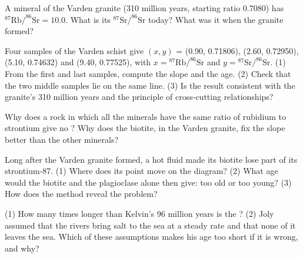 \begin{exercise}[$\star\star$]\label{exo:g12:age-of-the-earth:6}
A mineral of the Varden granite (310 million years, starting ratio 0.7080)
has $^{87}\mathrm{Rb}/^{86}\mathrm{Sr} = 10.0$. What is its
$^{87}\mathrm{Sr}/^{86}\mathrm{Sr}$ today? What was it when the granite
formed?
\end{exercise}

\begin{exercise}[$\star\star$]\label{exo:g12:age-of-the-earth:7}
Four samples of the Varden schist give $(x, y)$ = (0.90, 0.71806),
(2.60, 0.72950), (5.10, 0.74632) and (9.40, 0.77525), with $x =
{}^{87}\mathrm{Rb}/^{86}\mathrm{Sr}$ and $y = {}^{87}\mathrm{Sr}/^{86}\mathrm{Sr}$.
(1) From the first and last samples, compute the slope and the age.
(2) Check that the two middle samples lie on the same line. (3) Is the
result consistent with the granite's 310 million years and the principle of
cross-cutting relationships?
\end{exercise}

\begin{exercise}[$\star\star$]\label{exo:g12:age-of-the-earth:8}
Why does a rock in which all the minerals have the same ratio of rubidium to
strontium give no ? Why does the biotite, in the Varden granite,
fix the slope better than the other minerals?
\end{exercise}

\begin{exercise}[$\star\star$]\label{exo:g12:age-of-the-earth:9}
Long after the Varden granite formed, a hot fluid made its biotite lose part
of its strontium-87. (1) Where does its point move on the  diagram?
(2) What age would the biotite and the plagioclase alone then give: too old or
too young? (3) How does the  method reveal the problem?
\end{exercise}

\begin{exercise}[$\star\star$]\label{exo:g12:age-of-the-earth:10}
(1) How many times longer than Kelvin's 96 million years is the ? (2) Joly assumed that the rivers bring salt to the sea at a steady
rate and that none of it leaves the sea. Which of these assumptions makes his
age too short if it is wrong, and why?
\end{exercise}

